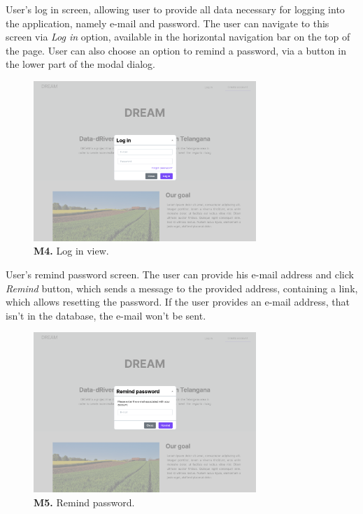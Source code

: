 User's log in screen, allowing user to provide all data necessary for logging into the application, namely e-mail and password. The user can navigate to this screen via \textit{Log in} option, available in the horizontal navigation bar on the top of the page. User can also choose an option to remind a password, via a button in the lower part of the modal dialog.
\begin{figure}[H]
    \centering
    \includegraphics[width=0.75\textwidth]{mockups/Unreg. user_Log in.png}
    \caption{\textbf{M4.} Log in view.}
\end{figure}

User's remind password screen. The user can provide his e-mail address and click \textit{Remind} button, which sends a message to the provided address, containing a link, which allows resetting the password. If the user provides an e-mail address, that isn't in the database, the e-mail won't be sent. 
\begin{figure}[H]
    \centering
    \includegraphics[width=0.75\textwidth]{mockups/Unreg. user_Remind password.png}
    \caption{\textbf{M5.} Remind password.}
\end{figure}


